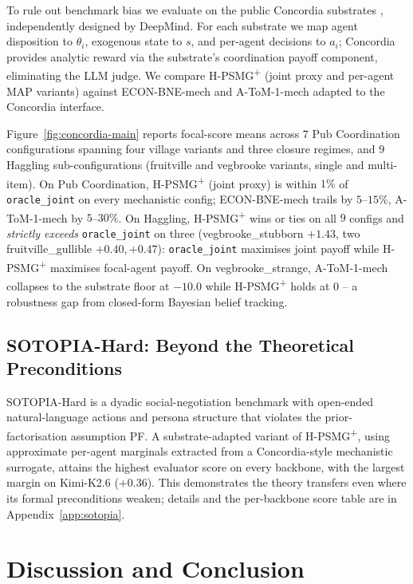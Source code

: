 To rule out benchmark bias we evaluate on the public Concordia substrates \citep{vezhnevets2023concordia, concordia_contest2025}, independently designed by DeepMind. For each substrate we map agent disposition to $\theta_i$, exogenous state to $s$, and per-agent decisions to $a_i$; Concordia provides analytic reward via the substrate's coordination payoff component, eliminating the LLM judge. We compare H-PSMG\textsuperscript{+} (joint proxy and per-agent MAP variants) against ECON-BNE-mech and A-ToM-1-mech adapted to the Concordia interface.

Figure~\ref{fig:concordia-main} reports focal-score means across $7$ Pub Coordination configurations spanning four village variants and three closure regimes, and $9$ Haggling sub-configurations (fruitville and vegbrooke variants, single and multi-item). On Pub Coordination, H-PSMG\textsuperscript{+} (joint proxy) is within $1\%$ of \texttt{oracle\_joint} on every mechanistic config; ECON-BNE-mech trails by $5$--$15\%$, A-ToM-1-mech by $5$--$30\%$. On Haggling, H-PSMG\textsuperscript{+} wins or ties on all $9$ configs and \emph{strictly exceeds} \texttt{oracle\_joint} on three (vegbrooke\_stubborn $+1.43$, two fruitville\_gullible $+0.40,+0.47$): \texttt{oracle\_joint} maximises joint payoff while H-PSMG\textsuperscript{+} maximises focal-agent payoff. On vegbrooke\_strange, A-ToM-1-mech collapses to the substrate floor at $-10.0$ while H-PSMG\textsuperscript{+} holds at $0$ -- a robustness gap from closed-form Bayesian belief tracking.

\subsection{SOTOPIA-Hard: Beyond the Theoretical Preconditions}
\label{sec:sotopia}

SOTOPIA-Hard \citep{zhou2024sotopia} is a dyadic social-negotiation benchmark with open-ended natural-language actions and persona structure that violates the prior-factorisation assumption PF. A substrate-adapted variant of H-PSMG\textsuperscript{+}, using approximate per-agent marginals extracted from a Concordia-style mechanistic surrogate, attains the highest evaluator score on every backbone, with the largest margin on Kimi-K2.6 ($+0.36$). This demonstrates the theory transfers even where its formal preconditions weaken; details and the per-backbone score table are in Appendix~\ref{app:sotopia}.

\section{Discussion and Conclusion}
\label{sec:discussion}

